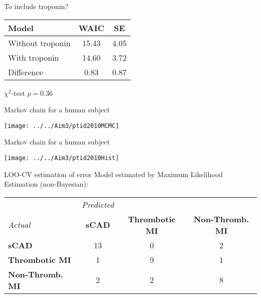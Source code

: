 \documentclass[xcolor=dvipsnames]{beamer}
\begin{document}
\begin{frame}{To include troponin?}
\vspace{-10.5pt}
\begin{center}
\begin{tabular}{lcc}
\hline
Model & WAIC  & SE \\
\hline
Without troponin & 15.43 & 4.05 \\ 
With troponin & 14.60 & 3.72 \\
Difference & 0.83 & 0.87 \\
\hline
\end{tabular}

$\chi^2$-test $p=0.36$
\end{center}
\end{frame}

\begin{frame}{Markov chain for a human subject}
\vspace{-5pt}
\begin{center}
\texttt{[image: ../../Aim3/ptid2010MCMC]}
\end{center}
\end{frame}

\begin{frame}{Markov chain for a human subject}
\vspace{-7pt}
\begin{center}
\texttt{[image: ../../Aim3/ptid2010Hist]}
\end{center}
\end{frame}

\begin{frame}{LOO-CV estimation of error}
\vspace{-15pt}
Model estimated by Maximum Likelihood Estimation (non-Bayesian):
\vspace{4ex}

\begin{tabular}{l|ccc}
& \emph{Predicted} & & \\
\emph{Actual}  & \textbf{sCAD} & \textbf{Thrombotic MI} & \textbf{Non-Thromb. MI} \\
\hline
\textbf{sCAD} & 13 &  0 & 2\\
\textbf{Thrombotic MI} &   1 & 9 &  1\\
\textbf{Non-Thromb. MI}  & 2  & 2 & 8 
\end{tabular}
\end{frame}
\end{document}
